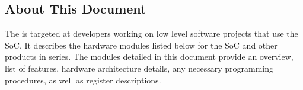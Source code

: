 \thispagestyle{empty}

\setcounter{page}{2}

\subsection*{About This Document}


The {\bfseries \chipname{} } is targeted at developers working on low level software projects that use the \chipname{} SoC. It describes the hardware modules listed below for the \chipname{} SoC and other products in \chipname{} series. The modules detailed in this document provide an overview, list of features, hardware architecture details, any necessary programming procedures, as well as register descriptions.


